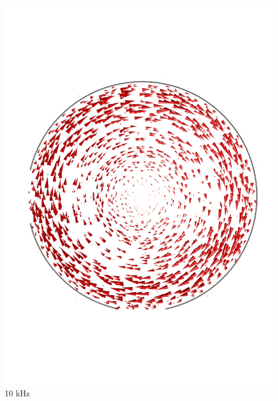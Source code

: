 \documentclass[compress]{beamer}
\begin{document}
\begin{frame}
\begin{columns}[totalwidth=\textwidth]
\begin{column}{.39\textwidth}
\end{column}
\begin{column}{.30\textwidth}
\centering
\includegraphics[width=0.99\textwidth]{Graphic/eddy_10khz.pdf}
{\small 10 kHz}
\end{column}
\begin{column}{.30\textwidth}
\centering

\end{column}
\end{columns}
\end{frame}
\end{document}
